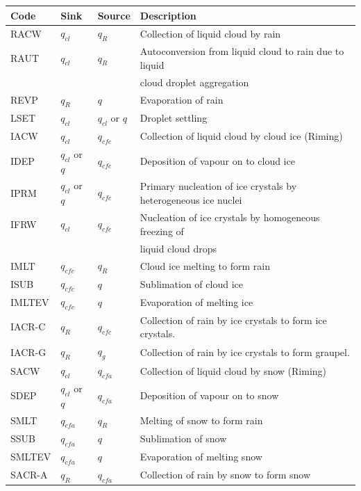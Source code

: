 \documentclass{UMDP_article}
\begin{document}
\begin{table}[ht!]
\begin{center}
\footnotesize
\begin{tabular}{|l|l|l|l|}
\hline
{\normalsize Code}&{{\normalsize Sink}}&{{\normalsize Source}}&
                                             {\normalsize Description} \\
\hline
RACW    &$q_{cl}$&$q_R$&
Collection of liquid cloud by rain\\
RAUT    &$q_{cl}$&$q_R$&
Autoconversion from liquid cloud to rain due to liquid \\
    &     &           & cloud droplet aggregation\\
REVP    &$q_R$&$q$&
Evaporation of rain\\
\hline
LSET    &$q_{cl}$ & $q_{cl}$ or $q$ &
Droplet settling \\
\hline
IACW    &$q_{cl}$&$q_{cfc}$&
Collection of liquid cloud by cloud ice (Riming)\\
IDEP    &$q_{cl}$ or $q$ &$q_{cfc}$&
Deposition of vapour on to cloud ice\\
IPRM    &$q_{cl}$ or $q$ &$q_{cfc}$&
Primary nucleation of ice crystals by heterogeneous ice nuclei \\
IFRW    &$q_{cl}$&$q_{cfc}$&
Nucleation of ice crystals by homogeneous freezing of  \\
    &     &           & liquid cloud drops\\
IMLT    &$q_{cfc}$ & $q_R$ &
Cloud ice melting to form rain\\
ISUB    &$q_{cfc}$ & $q$&
Sublimation of cloud ice\\
IMLTEV & $q_{cfc}$ & $q$ &
Evaporation of melting ice \\
IACR-C & $q_R$ & $q_{cfc}$ &
Collection of rain by ice crystals to form ice crystals. \\
IACR-G & $q_R$ & $q_{g}$ &
Collection of rain by ice crystals to form graupel. \\
\hline
SACW    &$q_{cl}$ &$q_{cfa}$&
Collection of liquid cloud by snow (Riming)\\
SDEP    &$q_{cl}$ or $q$&$q_{cfa}$&
Deposition of vapour on to snow\\
SMLT    &$q_{cfa}$&$q_R$&
Melting of snow to form rain\\
SSUB    &$q_{cfa}$&$q$&
Sublimation of snow \\
SMLTEV & $q_{cfa}$ & $q$ &
Evaporation of melting snow \\
SACR-A & $q_R$ & $q_{cfa}$ &
Collection of rain by snow to form snow \\

\end{tabular}
\end{center}
\end{table}
\end{document}
